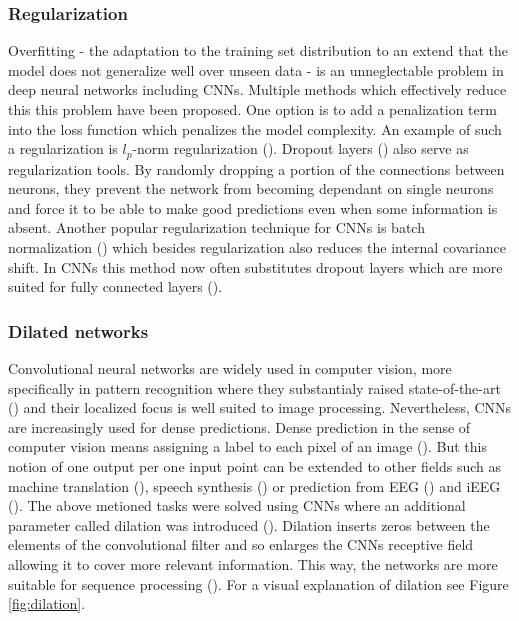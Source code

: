 \subsubsection{Regularization}
Overfitting - the adaptation to the training set distribution to an extend that the model does not generalize well over unseen data - is an unneglectable problem in deep neural networks including CNNs.
Multiple methods which effectively reduce this this problem have been proposed.
One option is to add a penalization term into the loss function which penalizes the model complexity.
An example of such a regularization is $l_p$-norm regularization (\cite{cnn-description}).
Dropout layers (\cite{drop-out}) also serve as regularization tools. 
By randomly dropping a portion of the connections between neurons, they prevent the network from becoming dependant on single neurons and force it to be able to make good predictions even when some information is absent.
Another popular regularization technique for CNNs is batch normalization (\cite{batch-norm}) which besides regularization also reduces the internal covariance shift. 
In CNNs this method now often substitutes dropout layers which are more suited for fully connected layers (\cite{cnn-description}).


\subsubsection{Dilated networks}
Convolutional neural networks are widely used in computer vision, more specifically in pattern recognition where they substantialy raised state-of-the-art (\cite{alexnet, dnn-computer-vision}) and their localized focus is well suited to image processing.
Nevertheless, CNNs are increasingly used for dense predictions.
Dense prediction in the sense of computer vision means assigning a label to each pixel of an image (\cite{dense-prediction-images}). 
But this notion of one output per one input point can be extended to other fields such as machine translation (\cite{dense-prediction-machine-translation}), speech synthesis (\cite{wavenet}) or prediction from EEG (\cite{schirrmeister-deep-2017}) and iEEG (\cite{Hammer-2021}).
The above metioned tasks were solved using CNNs where an additional parameter called dilation was introduced (\cite{dense-prediction-images}).
Dilation inserts zeros between the elements of the convolutional filter and so enlarges the CNNs receptive field allowing it to cover more relevant information.
This way, the networks are more suitable for sequence processing (\cite{cnn-description}).
For a visual explanation of dilation see Figure \ref{fig:dilation}.

